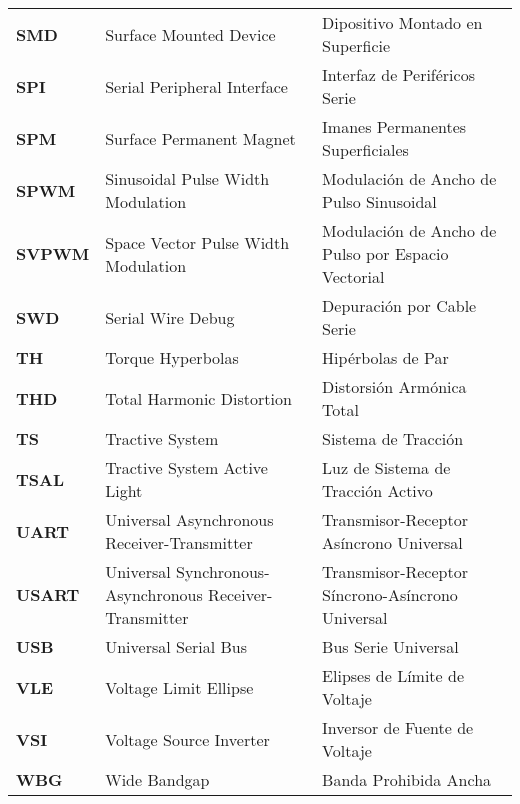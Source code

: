 \begin{longtable}{>{\bfseries}p{3cm} p{5cm} p{5cm}}
\textbf{SMD} & Surface Mounted Device & Dipositivo Montado en Superficie \\

\textbf{SPI} & Serial Peripheral Interface & Interfaz de Periféricos Serie \\

\textbf{SPM} & Surface Permanent Magnet & Imanes Permanentes Superficiales \\

\textbf{SPWM} & Sinusoidal Pulse Width Modulation & Modulación de Ancho de Pulso Sinusoidal \\

\textbf{SVPWM} & Space Vector Pulse Width Modulation & Modulación de Ancho de Pulso por Espacio Vectorial \\

\textbf{SWD} & Serial Wire Debug & Depuración por Cable Serie \\

\textbf{TH} & Torque Hyperbolas & Hipérbolas de Par \\

\textbf{THD} & Total Harmonic Distortion & Distorsión Armónica Total \\

\textbf{TS} & Tractive System & Sistema de Tracción \\

\textbf{TSAL} & Tractive System Active Light & Luz de Sistema de Tracción Activo \\

\textbf{UART} & Universal Asynchronous Receiver-Transmitter & Transmisor-Receptor Asíncrono Universal \\

\textbf{USART} & Universal Synchronous-Asynchronous Receiver-Transmitter & Transmisor-Receptor Síncrono-Asíncrono Universal \\

\textbf{USB} & Universal Serial Bus & Bus Serie Universal \\

\textbf{VLE} & Voltage Limit Ellipse & Elipses de Límite de Voltaje \\

\textbf{VSI} & Voltage Source Inverter & Inversor de Fuente de Voltaje \\

\textbf{WBG} & Wide Bandgap & Banda Prohibida Ancha \\

\end{longtable}

